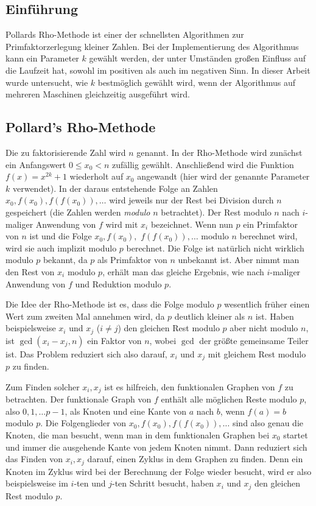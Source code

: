 \documentclass[a4paper, extrafontsizes, ngerman, 25pt]{memoir}
\begin{document}
\subsection{Einführung}

Pollards Rho-Methode ist einer der schnellsten Algorithmen zur Primfaktorzerlegung kleiner Zahlen. Bei der Implementierung des Algorithmus kann ein Parameter $k$ gewählt werden, der unter Umständen großen Einfluss auf die Laufzeit hat, sowohl im positiven als auch im negativen Sinn. In dieser Arbeit wurde untersucht, wie $k$ bestmöglich gewählt wird, wenn der Algorithmus auf mehreren Maschinen gleichzeitig ausgeführt wird.

\subsection{Pollard's Rho-Methode}

Die zu faktorisierende Zahl wird $n$ genannt. In der Rho-Methode wird zunächst ein Anfangswert $0 \le x_0 < n$ zufällig gewählt. Anschließend wird die Funktion $f(x) = x^{2k} + 1$ wiederholt auf $x_0$ angewandt (hier wird der genannte Parameter $k$ verwendet). In der daraus entstehende Folge an Zahlen $x_0, f(x_0), f(f(x_0)), \dots$ wird jeweils nur der Rest bei Division durch $n$ gespeichert (die Zahlen werden \emph{modulo} $n$ betrachtet). Der Rest modulo $n$ nach $i$-maliger Anwendung von $f$ wird mit $x_i$ bezeichnet. Wenn nun $p$ ein Primfaktor von $n$ ist und die Folge $x_0, f(x_0),$ $f(f(x_0)), \dots$ modulo $n$ berechnet wird, wird sie auch implizit modulo $p$ berechnet. Die Folge ist natürlich nicht wirklich modulo $p$ bekannt, da $p$ als Primfaktor von $n$ unbekannt ist. Aber nimmt man den Rest von $x_i$ modulo $p$, erhält man das gleiche Ergebnis, wie nach $i$-maliger Anwendung von $f$ und Reduktion modulo $p$.

Die Idee der Rho-Methode ist es, dass die Folge modulo $p$ wesentlich früher einen Wert zum zweiten Mal annehmen wird, da $p$ deutlich kleiner als $n$ ist. Haben beispielsweise $x_i$ und $x_j$ ($i \ne j$) den gleichen Rest modulo $p$ aber nicht modulo $n$, ist $\gcd(x_i - x_j, n)$ ein Faktor von $n$, wobei $\gcd$ der größte gemeinsame Teiler ist. Das Problem reduziert sich also darauf, $x_i$ und $x_j$ mit gleichem Rest modulo $p$ zu finden.

Zum Finden solcher $x_i, x_j$ ist es hilfreich, den funktionalen Graphen von $f$ zu betrachten. Der funktionale Graph von $f$ enthält alle möglichen Reste modulo $p$, also $0, 1, \dots p - 1$, als Knoten und eine Kante von $a$ nach $b$, wenn $f(a) = b$ modulo $p$. Die Folgenglieder von $x_0, f(x_0), f(f(x_0)), \dots$ sind also genau die Knoten, die man besucht, wenn man in dem funktionalen Graphen bei $x_0$ startet und immer die ausgehende Kante von jedem Knoten nimmt. Dann reduziert sich das Finden von $x_i, x_j$ darauf, einen Zyklus in dem Graphen zu finden. Denn ein Knoten im Zyklus wird bei der Berechnung der Folge wieder besucht, wird er also beispielsweise im $i$-ten und $j$-ten Schritt besucht, haben $x_i$ und $x_j$ den gleichen Rest modulo $p$.
\end{document}
